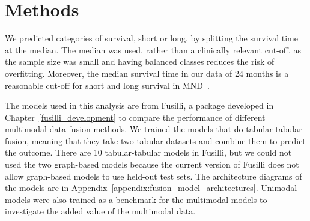 \section{Methods}

We predicted categories of survival, short or long, by splitting the survival time at the median.
The median was used, rather than a clinically relevant cut-off, as the sample size was small and having balanced classes reduces the risk of overfitting.
Moreover, the median survival time in our data of 24 months is a reasonable cut-off for short and long survival in MND~\cite{hardiman2017amyotrophic}.


The models used in this analysis are from Fusilli, a package developed in Chapter~\ref{fusilli_development} to compare the performance of different multimodal data fusion methods.
We trained the models that do tabular-tabular fusion, meaning that they take two tabular datasets and combine them to predict the outcome.
There are 10 tabular-tabular models in Fusilli, but we could not used the two graph-based models because the current version of Fusilli does not allow graph-based models to use held-out test sets.
The architecture diagrams of the models are in Appendix~\ref{appendix:fusion_model_architectures}.
Unimodal models were also trained as a benchmark for the multimodal models to investigate the added value of the multimodal data.

